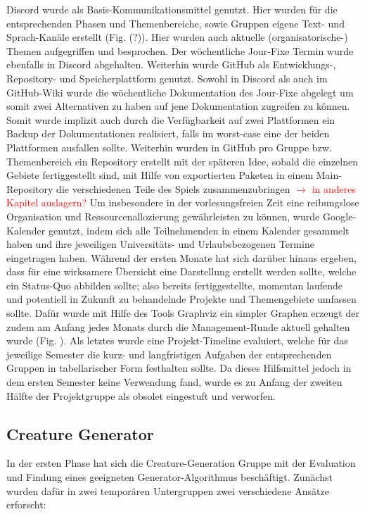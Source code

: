 Discord wurde als Basis-Kommunikationsmittel genutzt. Hier wurden für die entsprechenden Phasen und Themenbereiche, sowie Gruppen eigene Text- und Sprach-Kanäle erstellt (Fig. (?)). Hier wurden auch aktuelle (organisatorische-) Themen aufgegriffen und besprochen. Der wöchentliche Jour-Fixe Termin wurde ebenfalls in Discord abgehalten. Weiterhin wurde GitHub als Entwicklungs-, Repository- und Speicherplattform genutzt. Sowohl in Discord als auch im GitHub-Wiki wurde die wöchentliche Dokumentation des Jour-Fixe abgelegt um somit zwei Alternativen zu haben auf jene Dokumentation zugreifen zu können. Somit wurde implizit auch durch die Verfügbarkeit auf zwei Plattformen ein Backup der Dokumentationen realisiert, falls im worst-case eine der beiden Plattformen ausfallen sollte. Weiterhin wurden in GitHub pro Gruppe bzw. Themenbereich ein Repository erstellt mit der späteren Idee, sobald die einzelnen Gebiete fertiggestellt sind, mit Hilfe von exportierten Paketen in einem Main-Repository die verschiedenen Teile des Spiels zusammenzubringen  \textcolor{red}{$\rightarrow$ in anderes Kapitel auslagern?} Um insbesondere in der vorlesungsfreien Zeit eine reibungslose Organisation und Ressourcenallozierung gewährleisten zu können, wurde Google-Kalender genutzt, indem sich alle Teilnehmenden in einem Kalender gesammelt haben und ihre jeweiligen Universitäts- und Urlaubsbezogenen Termine eingetragen haben. Während der ersten Monate hat sich darüber hinaus ergeben, dass für eine wirksamere Übersicht eine Darstellung erstellt werden sollte, welche ein Status-Quo abbilden sollte; also bereits fertiggestellte, momentan laufende und potentiell in Zukunft zu behandelnde Projekte und Themengebiete umfassen sollte. Dafür wurde mit Hilfe des Tools Graphviz ein simpler Graphen erzeugt der zudem am Anfang jedes Monats durch die Management-Runde aktuell gehalten wurde (Fig. ). Als letztes wurde eine Projekt-Timeline evaluiert, welche für das jeweilige Semester die kurz- und langfristigen Aufgaben der entsprechenden Gruppen in tabellarischer Form festhalten sollte. Da dieses Hilfsmittel jedoch in dem ersten Semester keine Verwendung fand, wurde es zu Anfang der zweiten Hälfte der Projektgruppe als obsolet eingestuft und verworfen.


\subsection{Creature Generator}
\label{subsec:creature-generation-orga}

In der ersten Phase hat sich die Creature-Generation Gruppe mit der Evaluation und Findung eines geeigneten Generator-Algorithmus beschäftigt. Zunächst wurden dafür in zwei temporären Untergruppen zwei verschiedene Ansätze erforscht:

